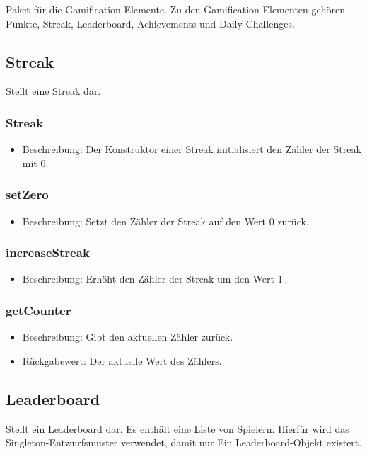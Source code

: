 \documentclass[a4paper]{scrreprt}
\begin{document}
	Paket für die Gamification-Elemente.
	Zu den Gamification-Elementen gehören Punkte, Streak, Leaderboard, Achievements und Daily-Challenges.


	\subsection{Streak}
	Stellt eine Streak dar.

	\subsubsection{Streak}
	\begin{itemize}
		\item Beschreibung: Der Konstruktor einer Streak initialisiert den Zähler der Streak mit 0.
	\end{itemize}
	\subsubsection{setZero}
	\begin{itemize}
		\item Beschreibung: Setzt den Zähler der Streak auf den Wert 0 zurück.
	\end{itemize}
	\subsubsection{increaseStreak}
	\begin{itemize}
		\item Beschreibung: Erhöht den Zähler der Streak um den Wert 1.
	\end{itemize}
	\subsubsection{getCounter}
	\begin{itemize}
		\item Beschreibung: Gibt den aktuellen Zähler zurück.
		\item Rückgabewert: Der aktuelle Wert des Zählers.
	\end{itemize}


	\subsection{Leaderboard}
	Stellt ein Leaderboard dar.
	Es enthält eine Liste von Spielern.
	Hierfür wird das Singleton-Entwurfsmuster verwendet, damit nur Ein Leaderboard-Objekt existert.
\end{document}
